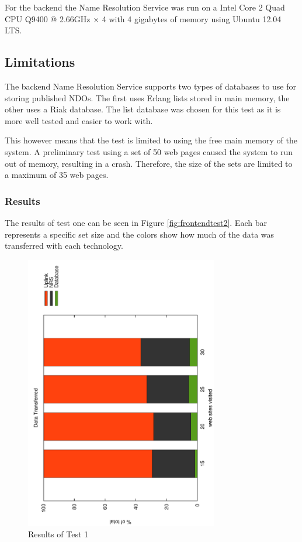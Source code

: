 For the backend the Name Resolution Service was run on a Intel Core 2 Quad CPU Q9400 @ 2.66GHz × 4 with 4 gigabytes of memory using Ubuntu 12.04 LTS.

\subsection{Limitations}

The backend Name Resolution Service supports two types of databases to use for storing published NDOs. The first uses Erlang lists stored in main memory, the other uses a Riak database. The list database was chosen for this test as it is more well tested and easier to work with.

This however means that the test is limited to using the free main memory of the system. A preliminary test using a set of 50 web pages caused the system to run out of memory, resulting in a crash. Therefore, the size of the sets are limited to a maximum of 35 web pages.

\subsubsection{Results}




The results of test one can be seen in Figure \ref{fig:frontendtest2}. Each bar represents a specific set size and the colors show how much of the data was transferred with each technology.

\begin{figure}
	\centering
		\includegraphics[width=0.75\textwidth, angle=-90]{./img/plots.pdf}
    	\caption{Results of Test 1}
	\label{fig:frontendtest1}
\end{figure}

